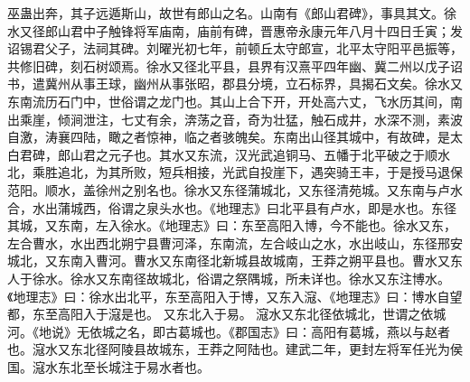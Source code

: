 \documentclass[12pt,UTF8]{ctexbook}
\begin{document}
巫蛊出奔，其子远遁斯山，故世有郎山之名。山南有《郎山君碑》，事具其文。徐水又径郎山君中子触锋将军庙南，庙前有碑，晋惠帝永康元年八月十四日壬寅；发诏锡君父子，法祠其碑。刘曜光初七年，前顿丘太守郎宣，北平太守阳平邑振等，共修旧碑，刻石树颂焉。徐水又径北平县，县界有汉熹平四年幽、冀二州以戊子诏书，遣冀州从事王球，幽州从事张昭，郡县分境，立石标界，具揭石文矣。徐水又东南流历石门中，世俗谓之龙门也。其山上合下开，开处高六丈，飞水历其间，南出乘崖，倾涧泄注，七丈有余，渀荡之音，奇为壮猛，触石成井，水深不测，素波自激，涛襄四陆，瞰之者惊神，临之者骇魄矣。东南出山径其城中，有故碑，是太白君碑，郎山君之元子也。其水又东流，汉光武追铜马、五幡于北平破之于顺水北，乘胜追北，为其所败，短兵相接，光武自投崖下，遇突骑王丰，于是授马退保范阳。顺水，盖徐州之别名也。徐水又东径蒲城北，又东径清苑城。又东南与卢水合，水出蒲城西，俗谓之泉头水也。《地理志》曰北平县有卢水，即是水也。东径其城，又东南，左入徐水。《地理志》曰：东至高阳入博，今不能也。徐水又东，左合曹水，水出西北朔宁县曹河泽，东南流，左合岐山之水，水出岐山，东径邢安城北，又东南入曹河。曹水又东南径北新城县故城南，王莽之朔平县也。曹水又东人于徐水。徐水又东南径故城北，俗谓之祭隅城，所未详也。徐水又东注博水。《地理志》曰：徐水出北平，东至高阳入于博，又东入滱、《地理志》曰：博水自望都，东至高阳入于滱是也。
又东北入于易。
滱水又东北径依城北，世谓之依城河。《地说》无依城之名，即古葛城也。《郡国志》曰：高阳有葛城，燕以与赵者也。滱水又东北径阿陵县故城东，王莽之阿陆也。建武二年，更封左将军任光为侯国。滱水东北至长城注于易水者也。
\end{document}
